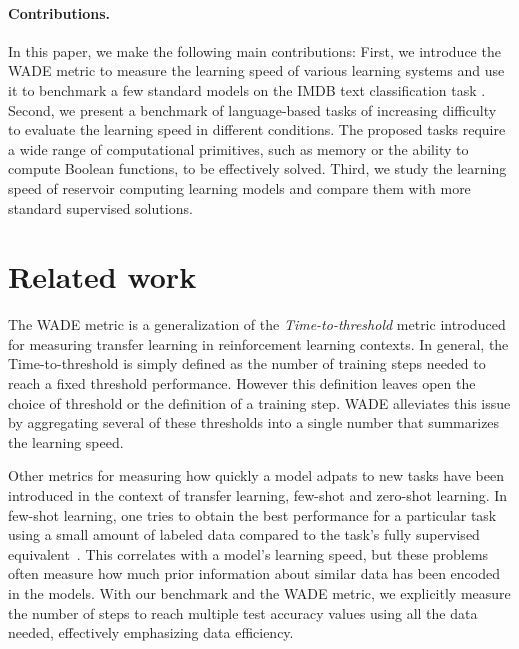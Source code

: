 \paragraph{Contributions.} In this paper, we make the following main contributions: First, we introduce the
\acf{WADE} metric to measure the learning speed of various learning systems and use it to benchmark a few standard models on the IMDB text
classification task \parencite{maasLearningWordVectors2011}.
Second, we present a benchmark of language-based tasks of increasing difficulty
to evaluate the learning speed in different conditions. The proposed tasks require a wide range of computational primitives, such as memory or the ability to compute Boolean functions, to be effectively solved.  Third, we study the
learning speed of reservoir computing learning models
and compare them with more standard supervised solutions.

\section{Related work}
The \ac{WADE} metric is a generalization of the \emph{Time-to-threshold} metric
\parencite{taylorCrossdomainTransferReinforcement2007,
  taylorTransferLearningInterTask2007} introduced for measuring transfer
learning in reinforcement learning contexts. In general, the Time-to-threshold
is simply defined as the number of training steps needed to reach a fixed
threshold performance. However this definition leaves open the choice of
threshold or the definition of a training step. \ac{WADE} alleviates this issue
by aggregating several of these thresholds into a single number that summarizes
the learning speed.

Other metrics for measuring how quickly a model adpats to new tasks have been
introduced in the context of transfer learning, few-shot and zero-shot learning.
In few-shot learning, one tries to obtain the best performance for a particular
task using a small amount of labeled data compared to the task's fully
supervised equivalent~\parencite{wangGeneralizingFewExamples2020}. This correlates
with a model's learning speed, but these problems often measure how much prior
information about similar data has been encoded in the models. With our
benchmark and the \ac{WADE} metric, we explicitly measure the number of steps to reach
multiple test accuracy values using all the data needed, effectively emphasizing
data efficiency.

